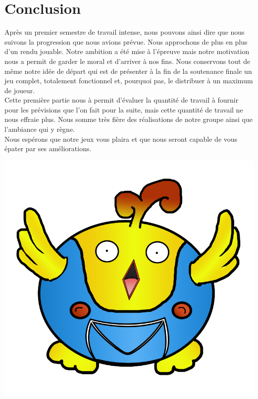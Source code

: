 \documentclass [11pt]{report}
\begin{document}
\chapter*{Conclusion}

Après un premier semestre de travail intense, nous pouvons ainsi dire que nous suivons la progression que nous avions prévue. Nous approchons de plus en plus d'un rendu jouable. Notre ambition a été mise à l'épreuve mais notre motivation nous a permit de garder le moral et d'arriver à nos fins. Nous conservons tout de même notre idée de départ qui est de présenter à la fin de la soutenance finale un jeu complet, totalement fonctionnel et, pourquoi pas, le distribuer à un maximum de joueur.\\

Cette première partie nous à permit d'évaluer la quantité de travail à fournir pour les prévisions que l'on fait pour la suite, mais cette quantité de travail ne nous effraie plus. Nous somme très fière des réalisations de notre groupe ainsi que l'ambiance qui y règne.\\

Nous espérons que notre jeux vous plaira et que nous seront capable de vous épater par ses améliorations.\\


\vspace{10mm}
		
		\begin{center}
		\includegraphics[scale=1.3]{images/birdfin.png}
		\end{center}
\end{document}
